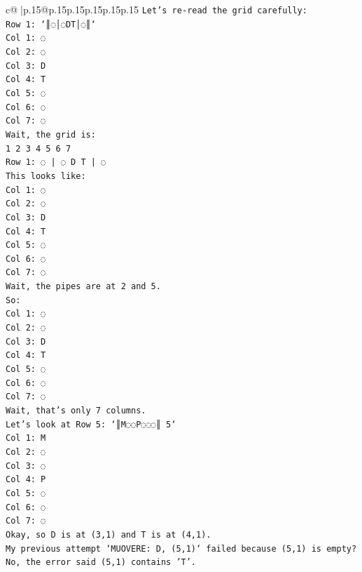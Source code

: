 \documentclass{article}
\begin{document}
{\begin{supertabular}{c@{$\;$}|p{.15\linewidth}@{}p{.15\linewidth}p{.15\linewidth}p{.15\linewidth}p{.15\linewidth}p{.15\linewidth}}
{{{\texttt{Let's re{-}read the grid carefully:} \\
\texttt{Row 1: `║◌│◌DT│◌║`} \\
\texttt{Col 1: ◌} \\
\texttt{Col 2: ◌} \\
\texttt{Col 3: D} \\
\texttt{Col 4: T} \\
\texttt{Col 5: ◌} \\
\texttt{Col 6: ◌} \\
\texttt{Col 7: ◌} \\
\texttt{Wait, the grid is:} \\
\texttt{1 2 3 4 5 6 7} \\
\texttt{Row 1: ◌ | ◌ D T | ◌} \\
\texttt{This looks like:} \\
\texttt{Col 1: ◌} \\
\texttt{Col 2: ◌} \\
\texttt{Col 3: D} \\
\texttt{Col 4: T} \\
\texttt{Col 5: ◌} \\
\texttt{Col 6: ◌} \\
\texttt{Col 7: ◌} \\
\texttt{Wait, the pipes are at 2 and 5.} \\
\texttt{So:} \\
\texttt{Col 1: ◌} \\
\texttt{Col 2: ◌} \\
\texttt{Col 3: D} \\
\texttt{Col 4: T} \\
\texttt{Col 5: ◌} \\
\texttt{Col 6: ◌} \\
\texttt{Col 7: ◌} \\
\texttt{Wait, that's only 7 columns.} \\
\texttt{Let's look at Row 5: `║M◌◌P◌◌◌║ 5`} \\
\texttt{Col 1: M} \\
\texttt{Col 2: ◌} \\
\texttt{Col 3: ◌} \\
\texttt{Col 4: P} \\
\texttt{Col 5: ◌} \\
\texttt{Col 6: ◌} \\
\texttt{Col 7: ◌} \\
\texttt{Okay, so D is at (3,1) and T is at (4,1).} \\
\texttt{My previous attempt `MUOVERE: D, (5,1)` failed because (5,1) is empty? No, the error said (5,1) contains 'T'.} \\
}}}
\end{supertabular}}
\end{document}
